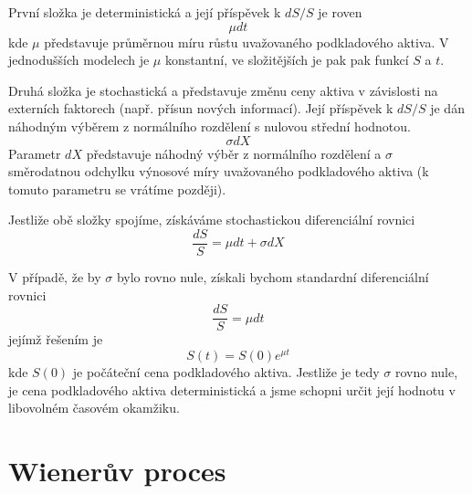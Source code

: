 \documentclass[a4paper]{book}
\begin{document}
První složka je deterministická a její příspěvek k $dS/S$ je roven
\begin{equation*}
\mu dt
\end{equation*}
kde $\mu$ představuje průměrnou míru růstu uvažovaného podkladového aktiva. V jednodušších modelech je $\mu$ konstantní, ve složitějších je pak pak funkcí $S$ a $t$.

Druhá složka je stochastická a představuje změnu ceny aktiva v závislosti na externích faktorech (např. přísun nových informací). Její příspěvek k $dS/S$ je dán náhodným výběrem z normálního rozdělení s nulovou střední hodnotou.
\begin{equation*}
\sigma dX
\end{equation*}
Parametr $dX$ představuje náhodný výběr z normálního rozdělení a $\sigma$ směrodatnou odchylku výnosové míry uvažovaného podkladového aktiva (k tomuto parametru se vrátíme později).

Jestliže obě složky spojíme, získáváme stochastickou diferenciální rovnici
\begin{equation}
\frac{dS}{S}=\mu dt + \sigma dX
\end{equation}

V případě, že by $\sigma$ bylo rovno nule, získali bychom standardní diferenciální rovnici
\begin{equation*}
\frac{dS}{S}=\mu dt
\end{equation*}
jejímž řešením je
\begin{equation*}
S(t)=S(0)e^{\mu t}
\end{equation*}
kde $S(0)$ je počáteční cena podkladového aktiva. Jestliže je tedy $\sigma$ rovno nule, je cena podkladového aktiva deterministická a jsme schopni určit její hodnotu v libovolném časovém okamžiku.

\section{Wienerův proces}
\end{document}
